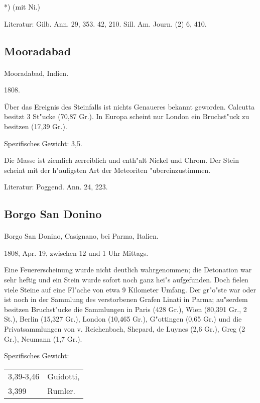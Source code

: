 \documentclass[a4paper, 11pt, oneside]{article}
\begin{document}
*) (mit Ni.)

Literatur: Gilb. Ann. 29, 353. 42, 210. Sill. Am. Journ. (2) 6, 410.

\subsection{Mooradabad}
\normalsize
\paragraph{}
Mooradabad, Indien.

1808.

Über das Ereignis des Steinfalls ist nichts Genaueres bekannt geworden. Calcutta besitzt 3 St"ucke (70,87 Gr.). In Europa scheint nur London ein Bruchst"uck zu besitzen (17,39 Gr.).

Spezifisches Gewicht: 3,5.

Die Masse ist ziemlich zerreiblich und enth"alt Nickel und Chrom. Der Stein scheint mit der h"aufigsten Art der Meteoriten "ubereinzustimmen.

Literatur: Poggend. Ann. 24, 223.

\subsection{Borgo San Donino}
\normalsize
\paragraph{}
Borgo San Donino, Casignano, bei Parma, Italien.

1808, Apr. 19, zwischen 12 und 1 Uhr Mittags.

Eine Feuererscheinung wurde nicht deutlich wahrgenommen; die Detonation war sehr heftig und ein Stein wurde sofort noch ganz hei"s aufgefunden. Doch fielen viele Steine auf eine Fl"ache von etwa 9 Kilometer Umfang. Der gr"o"ste war oder ist noch in der Sammlung des verstorbenen Grafen Linati in Parma; au"serdem besitzen Bruchst"ucke die Sammlungen in Paris (428 Gr.), Wien (80,391 Gr., 2 St.), Berlin (15,327 Gr.), London (10,465 Gr.), G"ottingen (0,65 Gr.) und die Privatsammlungen von v. Reichenbach, Shepard, de Luynes (2,6 Gr.), Greg (2 Gr.), Neumann (1,7 Gr.).

Spezifisches Gewicht:
\begin{table}[!ht]
    \centering
    \begin{tabular}{l l}
        3,39-3,46 & Guidotti,\\
        3,399 & Rumler.
    \end{tabular}
\end{table}
\end{document}
